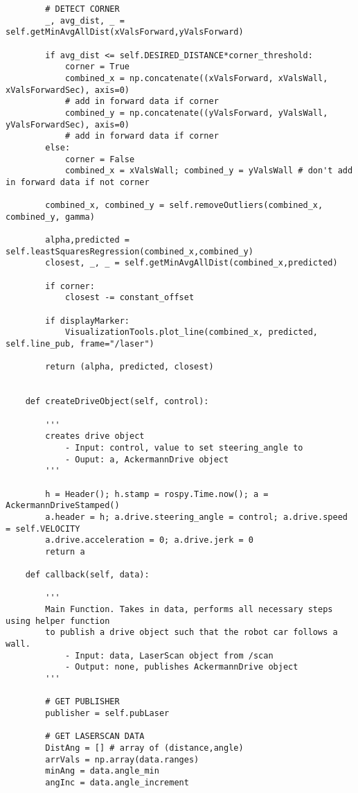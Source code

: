 \documentclass{article}
\begin{document}
{\begin{verbatim}
        # DETECT CORNER
        _, avg_dist, _ = self.getMinAvgAllDist(xValsForward,yValsForward)

        if avg_dist <= self.DESIRED_DISTANCE*corner_threshold:
            corner = True
            combined_x = np.concatenate((xValsForward, xValsWall, xValsForwardSec), axis=0) 
            # add in forward data if corner
            combined_y = np.concatenate((yValsForward, yValsWall, yValsForwardSec), axis=0) 
            # add in forward data if corner
        else:
            corner = False
            combined_x = xValsWall; combined_y = yValsWall # don't add in forward data if not corner

        combined_x, combined_y = self.removeOutliers(combined_x, combined_y, gamma)

        alpha,predicted = self.leastSquaresRegression(combined_x,combined_y) 
        closest, _, _ = self.getMinAvgAllDist(combined_x,predicted)

        if corner:
            closest -= constant_offset

        if displayMarker:
            VisualizationTools.plot_line(combined_x, predicted, self.line_pub, frame="/laser")

        return (alpha, predicted, closest)


    def createDriveObject(self, control):

        '''
        creates drive object
            - Input: control, value to set steering_angle to
            - Ouput: a, AckermannDrive object
        '''

        h = Header(); h.stamp = rospy.Time.now(); a = AckermannDriveStamped()
        a.header = h; a.drive.steering_angle = control; a.drive.speed = self.VELOCITY
        a.drive.acceleration = 0; a.drive.jerk = 0
        return a

    def callback(self, data): 

        '''
        Main Function. Takes in data, performs all necessary steps using helper function
        to publish a drive object such that the robot car follows a wall. 
            - Input: data, LaserScan object from /scan
            - Output: none, publishes AckermannDrive object
        '''

        # GET PUBLISHER
        publisher = self.pubLaser

        # GET LASERSCAN DATA
        DistAng = [] # array of (distance,angle)
        arrVals = np.array(data.ranges)
        minAng = data.angle_min
        angInc = data.angle_increment


\end{verbatim}}
\end{document}
